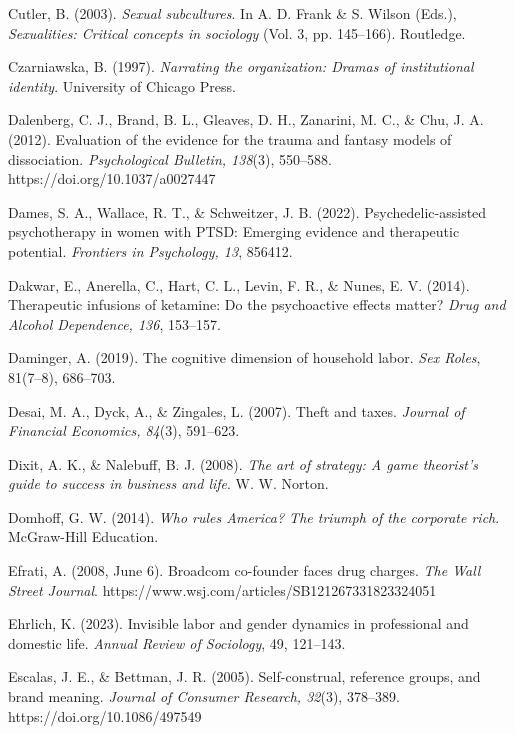 \begin{thebibliography}{}
    Cutler, B. (2003). \textit{Sexual subcultures}. In A. D. Frank \& S. Wilson (Eds.), \textit{Sexualities: Critical concepts in sociology} (Vol. 3, pp. 145--166). Routledge.
    
    Czarniawska, B. (1997). \textit{Narrating the organization: Dramas of institutional identity}. University of Chicago Press.

    Dalenberg, C. J., Brand, B. L., Gleaves, D. H., Zanarini, M. C., \& Chu, J. A. (2012). Evaluation of the evidence for the trauma and fantasy models of dissociation. \textit{Psychological Bulletin, 138}(3), 550–588. https://doi.org/10.1037/a0027447

    Dames, S. A., Wallace, R. T., \& Schweitzer, J. B. (2022). Psychedelic-assisted psychotherapy in women with PTSD: Emerging evidence and therapeutic potential. \textit{Frontiers in Psychology, 13}, 856412.

    Dakwar, E., Anerella, C., Hart, C. L., Levin, F. R., \& Nunes, E. V. (2014). Therapeutic infusions of ketamine: Do the psychoactive effects matter? \textit{Drug and Alcohol Dependence, 136}, 153–157.

    Daminger, A. (2019). The cognitive dimension of household labor. \textit{Sex Roles}, 81(7–8), 686–703.

    Desai, M. A., Dyck, A., \& Zingales, L. (2007). Theft and taxes. \textit{Journal of Financial Economics, 84}(3), 591–623.

    Dixit, A. K., \& Nalebuff, B. J. (2008). \textit{The art of strategy: A game theorist’s guide to success in business and life}. W. W. Norton.

    Domhoff, G. W. (2014). \textit{Who rules America? The triumph of the corporate rich}. McGraw-Hill Education.

    Efrati, A. (2008, June 6). Broadcom co-founder faces drug charges. \textit{The Wall Street Journal}. https://www.wsj.com/articles/SB121267331823324051
    
    Ehrlich, K. (2023). Invisible labor and gender dynamics in professional and domestic life. \textit{Annual Review of Sociology}, 49, 121–143.

    Escalas, J. E., \& Bettman, J. R. (2005). Self-construal, reference groups, and brand meaning. \textit{Journal of Consumer Research, 32}(3), 378--389. https://doi.org/10.1086/497549


\end{thebibliography}
